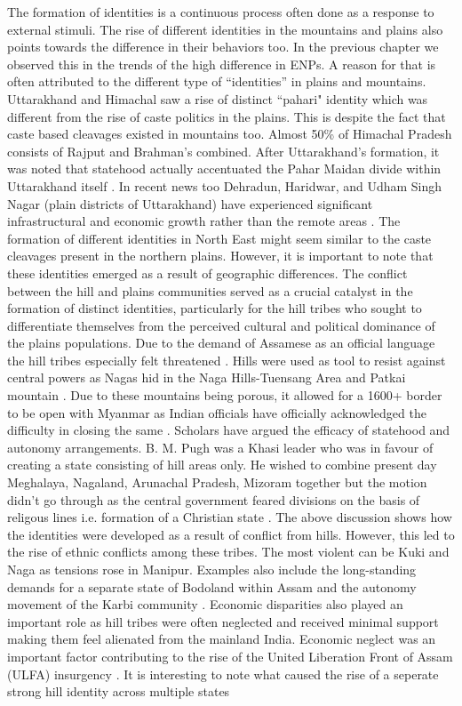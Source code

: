 The formation of identities is a continuous process often done as a response to external stimuli. The rise of different identities in the mountains and plains also points towards the difference in their behaviors too. In the previous chapter we observed this in the trends of the high difference in ENPs. A reason for that is often attributed to the different type of ``identities'' in plains and mountains. Uttarakhand and Himachal saw a rise of distinct ``pahari" identity \citep{mishra2000politics} which was different from the rise of caste politics in the plains. This is despite the fact that caste based cleavages existed in mountains too. Almost 50\% of Himachal Pradesh consists of Rajput and Brahman's combined. After Uttarakhand's formation, it was noted that statehood actually accentuated the Pahar Maidan divide within Uttarakhand itself \citep{mathur2015remote}. In recent news too Dehradun, Haridwar, and Udham Singh Nagar (plain districts of Uttarakhand) have experienced significant infrastructural and economic growth rather than the remote areas \citep{Mohammad_TOI}. The formation of different identities in North East might seem similar to the caste cleavages present in the northern plains. However, it is important to note that these identities emerged as a result of geographic differences. The conflict between the hill and plains communities served as a crucial catalyst in the formation of distinct identities, particularly for the hill tribes who sought to differentiate themselves from the perceived cultural and political dominance of the plains populations. Due to the demand of Assamese as an official language the hill tribes especially felt threatened \citep{inoue2005integration}. Hills were used as tool to resist against central powers as Nagas hid in the Naga Hills-Tuensang Area and Patkai mountain \citep{kapai2020spatial}. Due to these mountains being porous, it allowed for a 1600+ border to be open with Myanmar as Indian officials have officially acknowledged the difficulty in closing the same \citep{Bureau_2024}. Scholars have argued the efficacy of statehood and autonomy arrangements.  B. M. Pugh was a Khasi leader who was in favour of creating a state consisting of hill areas only. He wished to combine present day Meghalaya, Nagaland, Arunachal Pradesh, Mizoram together but the motion didn't go through as the central government feared divisions on the basis of religous lines i.e. formation of a Christian state \citep{karlsson2013evading}. The above discussion shows how the identities were developed as a result of conflict from hills. However, this led to the rise of ethnic conflicts among these tribes. The most violent can be Kuki and Naga as tensions rose in Manipur.  Examples also include the long-standing demands for a separate state of Bodoland within Assam  and the autonomy movement of the Karbi community \citep{sarma2017bodoland}. Economic disparities also played an important role as hill tribes were often neglected and received minimal support making them feel alienated from the mainland India. Economic neglect was an important factor contributing to the rise of the United Liberation Front of Assam (ULFA) insurgency \citep{chima2023insurgency}. It is interesting to note what caused the rise of a seperate strong hill identity across multiple states 